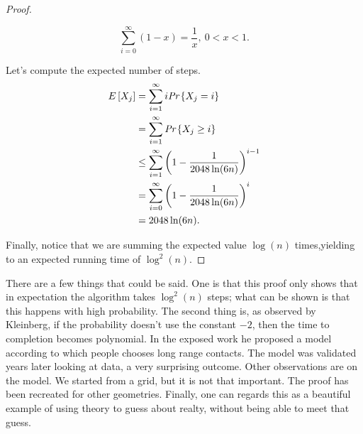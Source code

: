 \begin{proof}
\begin{obs}
	\begin{equation}
	\sum_{i=0}^\infty(1-x) = \frac{1}{x},\ 0 < x <1.
	\end{equation}
\end{obs}

Let's compute the expected number of steps.
\begin{align}
E\left[X_j\right] &= \sum_{i = 1}^\infty i\emph{Pr}\left\{X_j = i\right\}\\
&=\sum_{i = 1}^\infty\emph{Pr}\left\{X_j \geq i\right\}\\
&\leq \sum_{i = 1}^\infty\left(1 - \frac{1}{2048\ln(6n)}\right)^{i-1}\\
&=\sum_{i = 0}^\infty\left(1 - \frac{1}{2048\ln(6n)}\right)^{i}\\
&=2048\ln(6n).
\end{align}

Finally, notice that we are summing the expected value $\log(n)$ times,yielding to an expected running time of $\log^2(n)$.

\end{proof}

There are a few things that could be said. One is that this proof only shows that in expectation the algorithm takes $\log^2(n)$ steps; what can be shown is that this happens with high probability. The second thing is, as observed by Kleinberg, if the probability doesn't use the constant $-2$, then the time to completion becomes polynomial. In the exposed work he proposed a model according to which people chooses long range contacts. The model was validated years later looking at data, a very surprising outcome. Other observations are on the model. We started from a grid, but it is not that important. The proof has been recreated for other geometries. Finally, one can regards this as a beautiful example of using theory to guess about realty, without being able to meet that guess.

